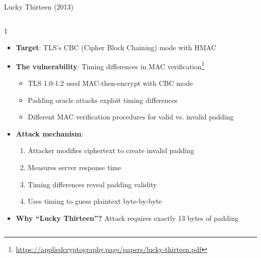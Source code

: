 \documentclass[aspectratio=169, lualatex, handout]{beamer}
\begin{document}
\begin{frame}{Lucky Thirteen (2013)}
	\begin{columns}[c]
		\begin{column}{1\textwidth}
			\begin{itemize}[<+->]
				\item \textbf{Target}: TLS's CBC (Cipher Block Chaining) mode with HMAC
				\item \textbf{The vulnerability}: Timing differences in MAC verification\footnote{\url{https://appliedcryptography.page/papers/lucky-thirteen.pdf}}
				      \begin{itemize}
					      \item TLS 1.0-1.2 used MAC-then-encrypt with CBC mode
					      \item Padding oracle attacks exploit timing differences
					      \item Different MAC verification procedures for valid vs. invalid padding
				      \end{itemize}
				\item \textbf{Attack mechanism}:
				      \begin{enumerate}
					      \item Attacker modifies ciphertext to create invalid padding
					      \item Measures server response time
					      \item Timing differences reveal padding validity
					      \item Uses timing to guess plaintext byte-by-byte
				      \end{enumerate}
				\item \textbf{Why ``Lucky Thirteen''?} Attack requires exactly 13 bytes of padding
			\end{itemize}
		\end{column}
	\end{columns}
\end{frame}
\end{document}
